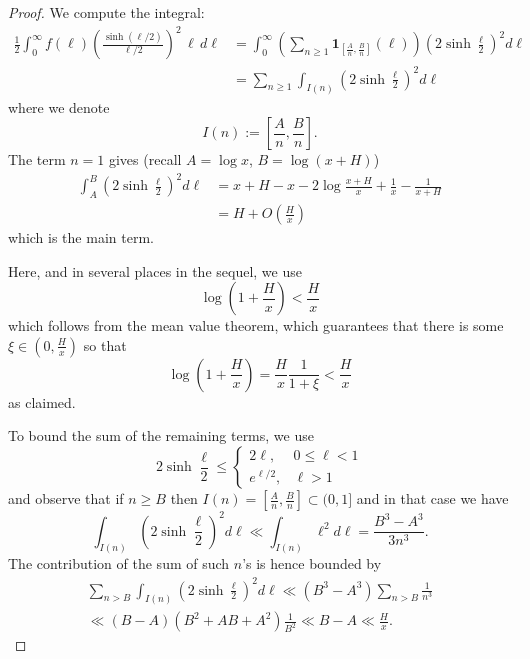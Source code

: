 \documentclass[12pt]{amsart}
\begin{document}
\begin{proof}
We compute the integral: 
\[
\begin{split} 
 \frac 12    \int_0^\infty f(\ell) \left( \frac {\sinh(\ell/2)}{\ell/2} \right)^2 \, \ell \,d\ell 
 & =   \int_{0}^{\infty}\left(  \sum_{n\geq 1} \mathbf 1_{[\frac An, \frac Bn]}(\ell) \right)   \left(2\sinh \frac \ell 2 \right)^2   d\ell 
\\
&= \sum_{n\geq 1} \int_{I(n)}  \left(2\sinh \frac \ell 2\right)^2  d\ell 
\end{split}
\]
where we denote 
$$
I(n):=[\frac An, \frac Bn].
$$  
The term $n=1$ gives  (recall $A=\log x$, $B=\log(x+H)$)
\begin{equation}\label{term n 1}
 \begin{split}
 \int_{A}^B  \left(2\sinh \frac \ell 2\right)^2  d\ell  &=x+H-x -2\log \frac{x+H}{x} + \frac 1x- \frac 1{x+H}\\
 &=H  + O\left(\frac{H }{x} \right)
 \end{split}
\end{equation}
which is the main term.  

Here, and in several places in the sequel, we use 
\begin{equation}\label{eq:log 1+H x}
\log \left( 1+\frac Hx \right) < \frac Hx
\end{equation}
which follows from the mean value theorem, which guarantees that there is some $\xi\in (0, \frac Hx)$ so that 
\[
  \log\left( 1+\frac Hx \right)   =\frac{H}{x}  \frac 1{1+\xi}<\frac Hx
 \]
as claimed. 

To bound the sum of the remaining terms, we use
\[
2\sinh\frac \ell 2\leq \begin{cases} 2\ell, &0\leq  \ell<1 \\ e^{\ell/2},&\ell>1 \end{cases}
\]
and observe that if $n\geq B$ then $I(n) = [\frac An,\frac Bn]\subset(0,1]$ and in that case we have
\[
\int_{I(n)}  \left(2\sinh\frac \ell 2\right)^2  d\ell \ll \int_{I(n)}  \ell^2 d\ell = \frac{B^3-A^3}{3n^3}.
\]
The contribution of the sum of such $n$'s is hence bounded by
\begin{multline}\label{eq:sum n grt B}
\sum_{n>B} \int_{I(n)} \left(2\sinh \frac \ell 2\right)^2  d\ell \ll (B^3-A^3)\sum_{n>B} \frac 1{n^3}
\\
 \ll (B-A)(B^2+AB+A^2)\frac 1{B^2} \ll B-A \ll \frac H{x} .
\end{multline}


\end{proof}
\end{document}
